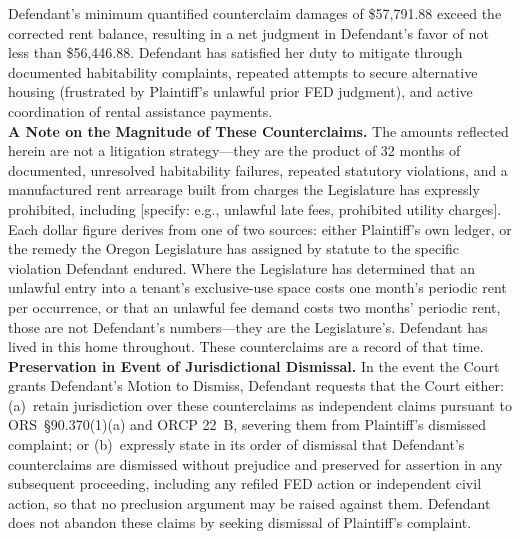 \documentclass[10pt,letterpaper,oneside]{extarticle}
\begin{document}
\indent Defendant's minimum quantified counterclaim damages
of \$57,791.88 exceed the corrected rent balance, resulting
in a net judgment in Defendant's favor of not less than
\$56,446.88. Defendant has satisfied her duty to mitigate
through documented habitability complaints, repeated
attempts to secure alternative housing (frustrated by
Plaintiff's unlawful prior FED judgment), and active
coordination of rental assistance payments.\\
\indent \textbf{A Note on the Magnitude of These
	Counterclaims.} The amounts reflected herein are not
a litigation strategy---they are the product of 32 months
of documented, unresolved habitability failures, repeated
statutory violations, and a manufactured rent arrearage
built from charges the Legislature has expressly prohibited,
including [specify: e.g., unlawful late fees, prohibited
utility charges]. Each dollar figure derives from one of
two sources: either Plaintiff's own ledger, or the remedy
the Oregon Legislature has assigned by statute to the
specific violation Defendant endured. Where the Legislature
has determined that an unlawful entry into a tenant's
exclusive-use space costs one month's periodic rent per
occurrence, or that an unlawful fee demand costs two months'
periodic rent, those are not Defendant's numbers---they are
the Legislature's. Defendant has lived in this home
throughout. These counterclaims are a record of that time.
\indent \textbf{Preservation in Event of Jurisdictional
	Dismissal.} In the event the Court grants Defendant's
Motion to Dismiss, Defendant requests that the Court
either: (a)~retain jurisdiction over these counterclaims
as independent claims pursuant to ORS~\S90.370(1)(a) and
ORCP 22~B, severing them from Plaintiff's dismissed
complaint; or (b)~expressly state in its order of
dismissal that Defendant's counterclaims are dismissed
without prejudice and preserved for assertion in any
subsequent proceeding, including any refiled FED action or
independent civil action, so that no preclusion argument
may be raised against them. Defendant does not abandon
these claims by seeking dismissal of Plaintiff's complaint.
\end{document}
